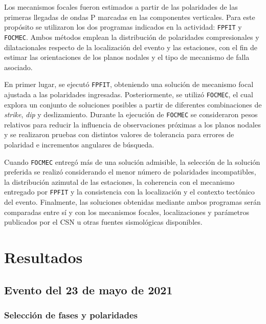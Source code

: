 \documentclass[a4paper,12pt]{article} %
\numberwithin{equation}{section} %
\numberwithin{figure}{section} %
\begin{document}
Los mecanismos focales fueron estimados a partir de las polaridades de las primeras llegadas de ondas P marcadas en las componentes verticales. Para este propósito se utilizaron los dos programas indicados en la actividad: \texttt{FPFIT} y \texttt{FOCMEC}. Ambos métodos emplean la distribución de polaridades compresionales y dilatacionales respecto de la localización del evento y las estaciones, con el fin de estimar las orientaciones de los planos nodales y el tipo de mecanismo de falla asociado.

En primer lugar, se ejecutó \texttt{FPFIT}, obteniendo una solución de mecanismo focal ajustada a las polaridades ingresadas. Posteriormente, se utilizó \texttt{FOCMEC}, el cual explora un conjunto de soluciones posibles a partir de diferentes combinaciones de \textit{strike}, \textit{dip} y deslizamiento. Durante la ejecución de \texttt{FOCMEC} se consideraron pesos relativos para reducir la influencia de observaciones próximas a los planos nodales y se realizaron pruebas con distintos valores de tolerancia para errores de polaridad e incrementos angulares de búsqueda.

Cuando \texttt{FOCMEC} entregó más de una solución admisible, la selección de la solución preferida se realizó considerando el menor número de polaridades incompatibles, la distribución azimutal de las estaciones, la coherencia con el mecanismo entregado por \texttt{FPFIT} y la consistencia con la localización y el contexto tectónico del evento. Finalmente, las soluciones obtenidas mediante ambos programas serán comparadas entre sí y con los mecanismos focales, localizaciones y parámetros publicados por el CSN u otras fuentes sismológicas disponibles.

\newpage

\section{Resultados}

\subsection{Evento del 23 de mayo de 2021}

\subsubsection{Selección de fases y polaridades}
\end{document}
